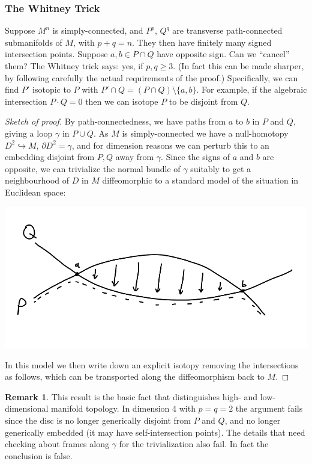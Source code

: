 \documentclass{article}
\theoremstyle{definition}
\newtheorem*{remark}{Remark}
\begin{document}
\subsubsection*{The Whitney Trick}

Suppose $M^n$ is simply-connected, and $P^p$, $Q^q$ are transverse
path-connected submanifolds of $M$, with $p+q=n$. They then have finitely many
signed intersection points. Suppose $a,b\in P\cap Q$ have opposite sign. Can we
``cancel'' them? The Whitney trick says: yes, if $p,q\ge3$. (In fact this can be
made sharper, by following carefully the actual requirements of the proof.)
Specifically, we can find $P'$ isotopic to $P$ with
$P'\cap Q=(P\cap Q)\setminus\{a,b\}$. For example, if the algebraic intersection
$P\cdot Q=0$ then we can isotope $P$ to be disjoint from $Q$.

\begin{proof}[Sketch of proof]
    By path-connectedness, we have paths from $a$ to $b$ in $P$ and $Q$, giving
    a loop $\gamma$ in $P\cup Q$. As $M$ is simply-connected we have a
    null-homotopy $D^2\hookrightarrow M$, $\partial D^2=\gamma$, and for
    dimension reasons we can perturb this to an embedding disjoint from $P,Q$
    away from $\gamma$. Since the signs of $a$ and $b$ are opposite, we can
    trivialize the normal bundle of $\gamma$ suitably to get a neighbourhood of
    $D$ in $M$ diffeomorphic to a standard model of the situation in Euclidean
    space:
    \begin{center}
        \includegraphics[scale=0.3]{manifolds_whitney}
    \end{center}
    In this model we then write down an explicit isotopy removing the
    intersections as follows, which can be transported along the diffeomorphism
    back to $M$.
\end{proof}

\begin{remark}
    This result is the basic fact that distinguishes high- and low-dimensional
    manifold topology. In dimension 4 with $p=q=2$ the argument fails since the
    disc is no longer generically disjoint from $P$ and $Q$, and no longer
    generically embedded (it may have self-intersection points). The details
    that need checking about frames along $\gamma$ for the trivialization also
    fail. In fact the conclusion is false.
\end{remark}
\end{document}
